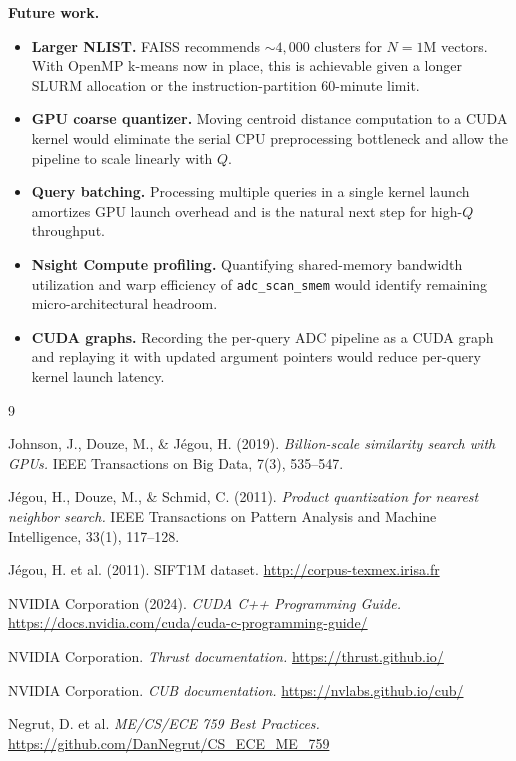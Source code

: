 \documentclass[12pt]{article}
\newcommand{\code}[1]{\texttt{\small #1}}
\begin{document}
\textbf{Future work.}
\begin{itemize}
  \item \textbf{Larger NLIST.} FAISS recommends ${\sim}4{,}000$ clusters for
        $N{=}1\text{M}$ vectors. With OpenMP k-means now in place, this is
        achievable given a longer SLURM allocation or the instruction-partition
        60-minute limit.
  \item \textbf{GPU coarse quantizer.} Moving centroid distance computation to
        a CUDA kernel would eliminate the serial CPU preprocessing bottleneck
        and allow the pipeline to scale linearly with $Q$.
  \item \textbf{Query batching.} Processing multiple queries in a single kernel
        launch amortizes GPU launch overhead and is the natural next step for
        high-$Q$ throughput.
  \item \textbf{Nsight Compute profiling.} Quantifying shared-memory bandwidth
        utilization and warp efficiency of \code{adc\_scan\_smem} would identify
        remaining micro-architectural headroom.
  \item \textbf{CUDA graphs.} Recording the per-query ADC pipeline as a CUDA
        graph and replaying it with updated argument pointers would reduce
        per-query kernel launch latency.
\end{itemize}

\begin{thebibliography}{9}

Johnson, J., Douze, M., \& J\'egou, H. (2019).
\textit{Billion-scale similarity search with GPUs.}
IEEE Transactions on Big Data, 7(3), 535--547.

J\'egou, H., Douze, M., \& Schmid, C. (2011).
\textit{Product quantization for nearest neighbor search.}
IEEE Transactions on Pattern Analysis and Machine Intelligence, 33(1), 117--128.

J\'egou, H. et al. (2011). SIFT1M dataset.
\url{http://corpus-texmex.irisa.fr}

NVIDIA Corporation (2024).
\textit{CUDA C++ Programming Guide.}
\url{https://docs.nvidia.com/cuda/cuda-c-programming-guide/}

NVIDIA Corporation.
\textit{Thrust documentation.}
\url{https://thrust.github.io/}

NVIDIA Corporation.
\textit{CUB documentation.}
\url{https://nvlabs.github.io/cub/}

Negrut, D. et al.
\textit{ME/CS/ECE 759 Best Practices.}
\url{https://github.com/DanNegrut/CS_ECE_ME_759}

\end{thebibliography}
\end{document}
